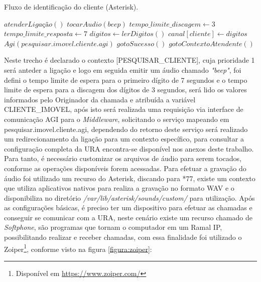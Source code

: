 
\begin{algorithm}
	\caption{Fluxo de identificação do cliente (Asterisk).}	
	\label{algoritmo:FluxoIdentificaoCliente}
	\begin{algorithmic}[1]
		\STATE $atenderLigação()$ 
		\STATE $tocarAudio(beep)$   
		\STATE $tempo\_limite\_discagem \gets 3$  		 
		\STATE $tempo\_limite\_resposta \gets 7$  
		\STATE $digitos  \gets lerDigitos()$  
		\STATE $canal [cliente]  \gets digitos$   
		\STATE $Agi(pesquisar.imovel.cliente.agi)$  
		\STATE $gotoSucesso()$  
		\ELSE
		\STATE $ gotoContextoAtendente()$  
		\ENDIF		
	\end{algorithmic}
\end{algorithm}


Neste trecho é declarado o contexto [PESQUISAR\_CLIENTE], cuja prioridade 1 será anteder a ligação e logo em seguida emitir um áudio chamado \textit{"beep"}, foi defini o tempo limite de espera para o primeiro dígito de 7 segundos e o tempo limite de espera para a discagem dos dígitos de 3 segundos, será lido os valores informados pelo Originador da chamada e atribuída a variável CLIENTE\_IMOVEL, após isto será realizada uma requisição via interface de comunicação  AGI para o \textit{Middleware}, solicitando o serviço mapeando em pesquisar.imovel.cliente.agi, dependendo do retorno deste serviço será realizado um redirecionamento da ligação para um contexto específico, para consultar a configuração completa da URA encontra-se disponível nos anexos deste trabalho.
Para tanto, é necessário customizar os arquivos de áudio para serem tocados, conforme as operações disponíveis forem acessadas. Para efetuar a gravação do áudio foi utilizado um recurso do Asterisk, discando para *77, existe um contexto que utiliza aplicativos nativos para realiza a gravação no formato WAV e o disponibiliza no diretório \textit{/var/lib/asterisk/sounds/custom/} para utilização.
Após as configurações básicas, é preciso ter um dispositivo para efetuar as chamadas e conseguir se comunicar com a URA, neste cenário existe um recurso chamado de \textit{Softphone}, são programas que tornam o computador em um Ramal IP, possibilitando realizar e receber chamadas, com essa finalidade foi utilizado o Zoiper\footnote{Disponível em \url{https://www.zoiper.com/}}, conforme visto na figura \ref{figura:zoiper}:

